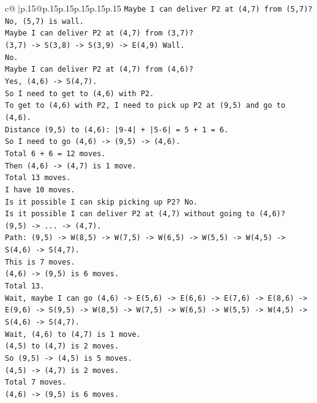 \documentclass{article}
\begin{document}
{\begin{supertabular}{c@{$\;$}|p{.15\linewidth}@{}p{.15\linewidth}p{.15\linewidth}p{.15\linewidth}p{.15\linewidth}p{.15\linewidth}}
{{{\texttt{Maybe I can deliver P2 at (4,7) from (5,7)? No, (5,7) is wall.} \\
\texttt{Maybe I can deliver P2 at (4,7) from (3,7)?} \\
\texttt{(3,7) {-}> S(3,8) {-}> S(3,9) {-}> E(4,9) Wall.} \\
\texttt{No.} \\
\texttt{Maybe I can deliver P2 at (4,7) from (4,6)?} \\
\texttt{Yes, (4,6) {-}> S(4,7).} \\
\texttt{So I need to get to (4,6) with P2.} \\
\texttt{To get to (4,6) with P2, I need to pick up P2 at (9,5) and go to (4,6).} \\
\texttt{Distance (9,5) to (4,6): |9{-}4| + |5{-}6| = 5 + 1 = 6.} \\
\texttt{So I need to go (4,6) {-}> (9,5) {-}> (4,6).} \\
\texttt{Total 6 + 6 = 12 moves.} \\
\texttt{Then (4,6) {-}> (4,7) is 1 move.} \\
\texttt{Total 13 moves.} \\
\texttt{I have 10 moves.} \\
\texttt{Is it possible I can skip picking up P2? No.} \\
\texttt{Is it possible I can deliver P2 at (4,7) without going to (4,6)?} \\
\texttt{(9,5) {-}> ... {-}> (4,7).} \\
\texttt{Path: (9,5) {-}> W(8,5) {-}> W(7,5) {-}> W(6,5) {-}> W(5,5) {-}> W(4,5) {-}> S(4,6) {-}> S(4,7).} \\
\texttt{This is 7 moves.} \\
\texttt{(4,6) {-}> (9,5) is 6 moves.} \\
\texttt{Total 13.} \\
\texttt{Wait, maybe I can go (4,6) {-}> E(5,6) {-}> E(6,6) {-}> E(7,6) {-}> E(8,6) {-}> E(9,6) {-}> S(9,5) {-}> W(8,5) {-}> W(7,5) {-}> W(6,5) {-}> W(5,5) {-}> W(4,5) {-}> S(4,6) {-}> S(4,7).} \\
\texttt{Wait, (4,6) to (4,7) is 1 move.} \\
\texttt{(4,5) to (4,7) is 2 moves.} \\
\texttt{So (9,5) {-}> (4,5) is 5 moves.} \\
\texttt{(4,5) {-}> (4,7) is 2 moves.} \\
\texttt{Total 7 moves.} \\
\texttt{(4,6) {-}> (9,5) is 6 moves.} \\
}}}
\end{supertabular}}
\end{document}
